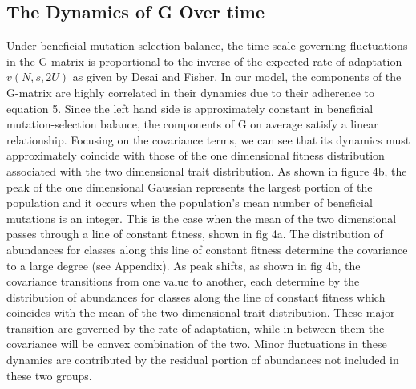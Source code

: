 \documentclass[11pt,twocolumn]{article}
\begin{document}
\subsection{The Dynamics of \textbf{G} Over time}
Under beneficial mutation-selection balance, the time scale governing fluctuations in the G-matrix is proportional to the inverse of the expected rate of adaptation $v(N,s,2U)$ as given by Desai and Fisher. In our model, the components of the G-matrix are highly correlated in their dynamics due to their adherence to equation 5. Since the left hand side is approximately constant in beneficial mutation-selection balance, the components of G on average satisfy a linear relationship. Focusing on the covariance terms, we can see that its dynamics must approximately coincide with those of the one dimensional fitness distribution associated with the two dimensional trait distribution.  As shown in figure 4b, the peak of the one dimensional Gaussian represents the largest portion of the population and it occurs when the population's mean number of beneficial mutations is an integer.  This is the case when the mean of the two dimensional passes through a line of constant fitness, shown in fig 4a. The distribution of abundances for classes along this line of constant fitness determine the covariance to a large degree (see Appendix).  As peak shifts, as shown in fig 4b, the covariance transitions from one value to another, each determine by the distribution of abundances for classes along the line of constant fitness which coincides with the mean of the two dimensional trait distribution. These major transition are governed by the rate of adaptation, while in between them the covariance will be convex combination of the two. Minor fluctuations in these dynamics are contributed by the residual portion of abundances not included in these two groups. 
\end{document}
